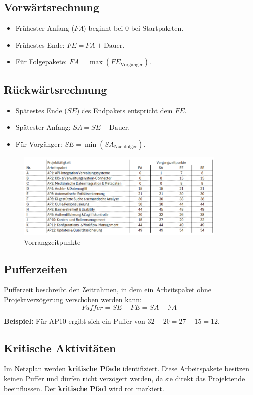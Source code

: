 \subsection{Vorwärtsrechnung}
\begin{itemize}
  \item Frühester Anfang ($FA$) beginnt bei 0 bei Startpaketen.
  \item Frühestes Ende: $FE = FA + \text{Dauer}$.
  \item Für Folgepakete: $FA = \max(FE_{\text{Vorgänger}})$.
\end{itemize}

\subsection{Rückwärtsrechnung}
\begin{itemize}
  \item Spätestes Ende ($SE$) des Endpakets entspricht dem $FE$.
  \item Spätester Anfang: $SA = SE - \text{Dauer}$.
  \item Für Vorgänger: $SE = \min(SA_{\text{Nachfolger}})$.
\end{itemize}

\begin{figure}[ht]
	\centering
	\includegraphics[width=0.9\textwidth]{fig/vorrangliste2.png}
	\caption{Vorrangzeitpunkte}
	\label{fig:vorrangzeitpunkte}
\end{figure}

\subsection{Pufferzeiten}
Pufferzeit beschreibt den Zeitrahmen, in dem ein Arbeitspaket ohne Projektverzögerung verschoben werden kann:
\[
Puffer = SE - FE = SA - FA
\]

\textbf{Beispiel:} Für AP10 ergibt sich ein Puffer von $32 - 20 = 27 - 15 = 12$.

\subsection{Kritische Aktivitäten}
Im Netzplan werden \textbf{kritische Pfade} identifiziert. Diese Arbeitspakete besitzen keinen Puffer und dürfen nicht verzögert werden, da sie direkt das Projektende beeinflussen. Der \textbf{kritische Pfad} wird rot markiert.

